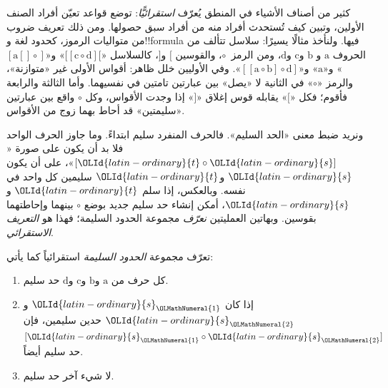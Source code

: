 \documentclass[../../../include/open-logic-section]{subfiles}
\begin{document}


كثير من أصناف الأشياء في المنطق يُعرّف \emph{استقرائيًّا}: توضع قواعد
تعيّن أفراد الصنف الأولين، وتبين كيف تُستحدث أفراد منه من أفراد سبق
حصولها. ومن ذلك تعريف ضروب من متواليات الرموز، كحدود لغة و!!{formula}
فيها. ولنأخذ مثالًا يسيرًا: سلاسل تتألف من الحروف $\mathrm{a}$ و
$\mathrm{b}$ و$\mathrm{c}$ و$\mathrm{d}$، ومن الرمز~$\circ$،
والقوسين $[$ و$]$، كالسلاسل
«$[[\mathrm{c} \circ \mathrm{d}][$» و«$[\mathrm{a}[]\circ]$»
و«$\mathrm{a}$» و«$[[\mathrm{a} \circ \mathrm{b}]\circ
\mathrm{d}]$». وفي الأوليين خلل ظاهر: أقواس الأولى غير «متوازنة»،
والرمز «$\circ$» في الثانية لا «يصل» بين عبارتين تامتين في نفسيهما.
وأما الثالثة والرابعة فأقوم؛ فكل «$[$» يقابله قوس إغلاق «$]$» إذا
وجدت الأقواس، وكل $\circ$ واقع بين عبارتين «سليمتين» قد أحاط بهما زوج
من الأقواس.

ونريد ضبط معنى «الحد السليم». فالحرف المنفرد سليم ابتداءً. وما جاوز
الحرف الواحد فلا بد أن يكون على صورة «$[\OLId{latin-ordinary}{t} \circ \OLId{latin-ordinary}{s}]$»، على أن يكون
$\OLId{latin-ordinary}{s}$ و$\OLId{latin-ordinary}{t}$ سليمين كل واحد في نفسه. وبالعكس، إذا سلم $\OLId{latin-ordinary}{t}$ و$\OLId{latin-ordinary}{s}$، أمكن
إنشاء حد سليم جديد بوضع $\circ$ بينهما وإحاطتهما بقوسين. وبهاتين
العمليتين \emph{نعرّف} مجموعة الحدود السليمة؛ فهذا هو
\emph{التعريف الاستقرائي}.

\begin{defn}
  تعرّف مجموعة \emph{الحدود السليمة} استقرائياً كما يأتي:
  \begin{enumerate}
  \item كل حرف من $\mathrm{a}$ و$\mathrm{b}$ و$\mathrm{c}$
    و$\mathrm{d}$ حد سليم.
  \item إذا كان $\OLId{latin-ordinary}{s}_\OLMathNumeral{1}$ و$\OLId{latin-ordinary}{s}_\OLMathNumeral{2}$ حدين سليمين، فإن
    $[\OLId{latin-ordinary}{s}_\OLMathNumeral{1} \circ \OLId{latin-ordinary}{s}_\OLMathNumeral{2}]$ حد سليم أيضاً.
  \item لا شيء آخر حد سليم.
  \end{enumerate}
\end{defn}
\end{document}
